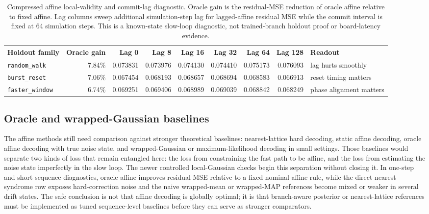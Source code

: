 \documentclass[11pt]{article}
\begin{document}
\begin{table}[ht]
\centering
\scriptsize
\setlength{\tabcolsep}{2.5pt}
\begin{tabular}{lrrrrrrrl}
\toprule
Holdout family & Oracle gain & Lag 0 & Lag 8 & Lag 16 & Lag 32 & Lag 64 & Lag 128 & Readout \\
\midrule
\texttt{random\_walk} & 7.84\% & 0.073831 & 0.073976 & 0.074130 & 0.074410 & 0.075173 & 0.076093 & lag hurts smoothly \\
\texttt{burst\_reset} & 7.06\% & 0.067454 & 0.068193 & 0.068657 & 0.068694 & 0.068583 & 0.066913 & reset timing matters \\
\texttt{faster\_window} & 6.74\% & 0.069251 & 0.069406 & 0.068989 & 0.069039 & 0.068842 & 0.068249 & phase alignment matters \\
\bottomrule
\end{tabular}
\caption{Compressed affine local-validity and commit-lag diagnostic.  Oracle
gain is the residual-MSE reduction of oracle affine relative to fixed affine.
Lag columns sweep additional simulation-step lag for lagged-affine residual
MSE while the commit interval is fixed at 64 simulation steps.  This is a
known-state slow-loop diagnostic, not
trained-branch holdout proof or board-latency evidence.}
\label{tab:lag-validity-note}
\end{table}

\subsection{Oracle and wrapped-Gaussian baselines}

The affine methods still need comparison against stronger theoretical
baselines: nearest-lattice hard decoding, static affine decoding, oracle
affine decoding with true noise state, and wrapped-Gaussian or
maximum-likelihood decoding in small settings.  Those baselines would separate
two kinds of loss that remain entangled here: the loss from constraining the
fast path to be affine, and the loss from estimating the noise state
imperfectly in the slow loop.
The newer controlled local-Gaussian checks begin this separation without
closing it.  In one-step and short-sequence diagnostics, oracle affine improves
residual MSE relative to a fixed nominal affine rule, while the direct
nearest-syndrome row exposes hard-correction noise and the naive wrapped-mean
or wrapped-MAP references become mixed or weaker in several drift states.  The
safe conclusion is not that affine decoding is globally optimal; it is that
branch-aware posterior or nearest-lattice references must be implemented as
tuned sequence-level baselines before they can serve as stronger comparators.
\end{document}
